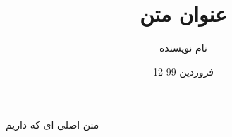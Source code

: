 \documentclass{article}
\title{عنوان متن}
\author{نام نویسنده}
\date{12 فروردین 99}
\begin{document}
\maketitle

متن اصلی ای که داریم
\end{document}
